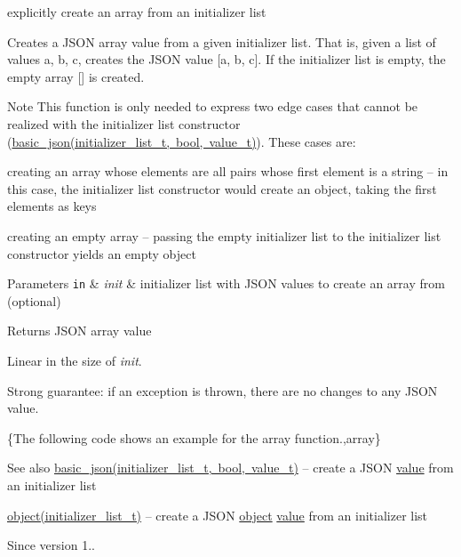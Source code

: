 explicitly create an array from an initializer list 

Creates a J\+S\+ON array value from a given initializer list. That is, given a list of values {\ttfamily a, b, c}, creates the J\+S\+ON value {\ttfamily \mbox{[}a, b, c\mbox{]}}. If the initializer list is empty, the empty array {\ttfamily \mbox{[}\mbox{]}} is created.

\begin{DoxyNote}{Note}
This function is only needed to express two edge cases that cannot be realized with the initializer list constructor (\mbox{\hyperlink{classnlohmann_1_1basic__json_ab5dfd9a2b2663b219641cb7fe59b6da2}{basic\+\_\+json(initializer\+\_\+list\+\_\+t, bool, value\+\_\+t)}}). These cases are\+:
\begin{DoxyEnumerate}
\item creating an array whose elements are all pairs whose first element is a string -- in this case, the initializer list constructor would create an object, taking the first elements as keys
\item creating an empty array -- passing the empty initializer list to the initializer list constructor yields an empty object
\end{DoxyEnumerate}
\end{DoxyNote}

\begin{DoxyParams}[1]{Parameters}
\mbox{\tt in}  & {\em init} & initializer list with J\+S\+ON values to create an array from (optional)\\
\hline
\end{DoxyParams}
\begin{DoxyReturn}{Returns}
J\+S\+ON array value
\end{DoxyReturn}
Linear in the size of {\itshape init}.

Strong guarantee\+: if an exception is thrown, there are no changes to any J\+S\+ON value.

\{The following code shows an example for the {\ttfamily array} function.,array\}

\begin{DoxySeeAlso}{See also}
\mbox{\hyperlink{classnlohmann_1_1basic__json_ab5dfd9a2b2663b219641cb7fe59b6da2}{basic\+\_\+json(initializer\+\_\+list\+\_\+t, bool, value\+\_\+t)}} -- create a J\+S\+ON \mbox{\hyperlink{classnlohmann_1_1basic__json_adcf8ca5079f5db993820bf50036bf45d}{value}} from an initializer list 

\mbox{\hyperlink{classnlohmann_1_1basic__json_aa13f7c0615867542ce80337cbcf13ada}{object(initializer\+\_\+list\+\_\+t)}} -- create a J\+S\+ON \mbox{\hyperlink{classnlohmann_1_1basic__json_aa13f7c0615867542ce80337cbcf13ada}{object}} \mbox{\hyperlink{classnlohmann_1_1basic__json_adcf8ca5079f5db993820bf50036bf45d}{value}} from an initializer list
\end{DoxySeeAlso}
\begin{DoxySince}{Since}
version 1.. 
\end{DoxySince}
\mbox{\label{classnlohmann_1_1basic__json_a73ae333487310e3302135189ce8ff5d8}} 
